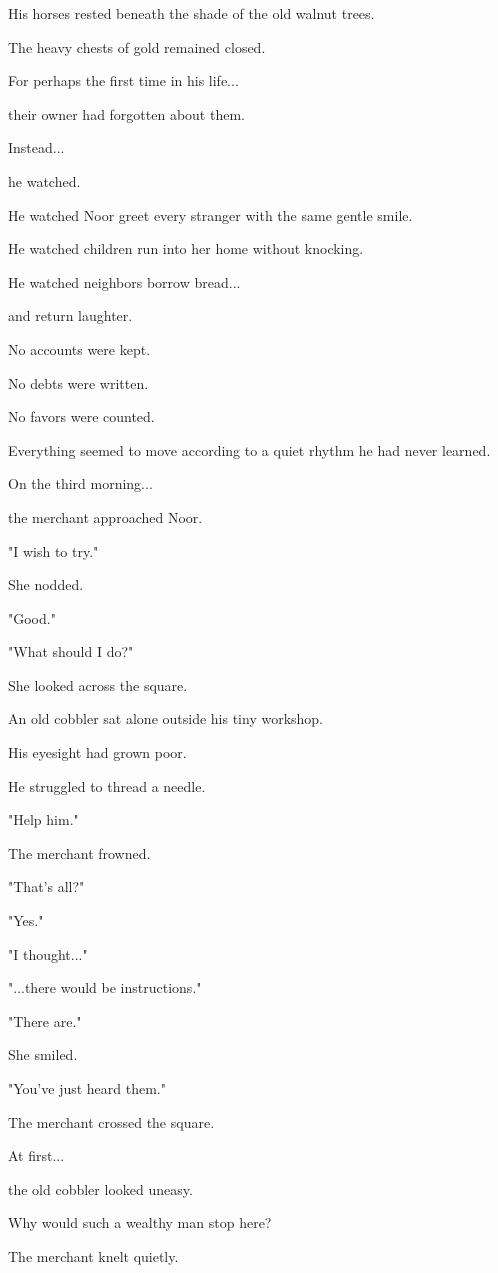 \documentclass[12pt,openany]{book}
\begin{document}
His horses rested beneath the shade of the old walnut trees.

The heavy chests of gold remained closed.

For perhaps the first time in his life...

their owner had forgotten about them.

Instead...

he watched.

He watched Noor greet every stranger with the same gentle smile.

He watched children run into her home without knocking.

He watched neighbors borrow bread...

and return laughter.

No accounts were kept.

No debts were written.

No favors were counted.

Everything seemed to move according to a quiet rhythm he had never learned.

On the third morning...

the merchant approached Noor.

"I wish to try."

She nodded.

"Good."

"What should I do?"

She looked across the square.

An old cobbler sat alone outside his tiny workshop.

His eyesight had grown poor.

He struggled to thread a needle.

"Help him."

The merchant frowned.

"That's all?"

"Yes."

"I thought..."

"...there would be instructions."

"There are."

She smiled.

"You've just heard them."

The merchant crossed the square.

At first...

the old cobbler looked uneasy.

Why would such a wealthy man stop here?

The merchant knelt quietly.
\end{document}
